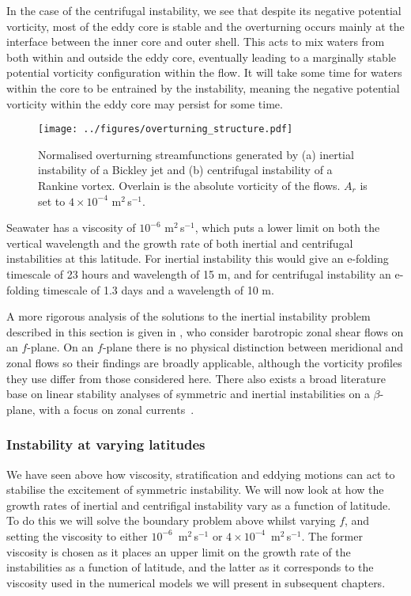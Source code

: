 In the case of the centrifugal instability, we see that despite its negative potential vorticity, most of the eddy core is stable and the overturning occurs mainly at the interface between the inner core and outer shell. This acts to mix waters from both within and outside the eddy core, eventually leading to a marginally stable potential vorticity configuration within the flow. It will take some time for waters within the core to be entrained by the instability, meaning the negative potential vorticity within the eddy core may persist for some time.

\begin{figure}
    \centering
    \texttt{[image: ../figures/overturning\_structure.pdf]}
    \caption{Normalised overturning streamfunctions generated by (a) inertial instability of a Bickley jet and (b) centrifugal instability of a Rankine vortex. Overlain is the absolute vorticity of the flows. $A_r$ is set to $4 \times 10^{-4}$ m$^2\,$s$^{-1}$.}
    \label{fig:2DStructure}
\end{figure}

Seawater has a viscosity of $10^{-6}$ m$^{2}$\,s$^{-1}$, which puts a lower limit on both the vertical wavelength and the growth rate of both inertial and centrifugal instabilities at this latitude. For inertial instability this would give an e-folding timescale of 23 hours and wavelength of 15 m, and for centrifugal instability an e-folding timescale of 1.3 days and a wavelength of 10 m. 

A more rigorous analysis of the solutions to the inertial instability problem described in this section is given in \citet{Plougonven2009}, who consider barotropic zonal shear flows on an $f$-plane. On an $f$-plane there is no physical distinction between meridional and zonal flows so their findings are broadly applicable, although the vorticity profiles they use differ from those considered here. There also exists a broad literature base on linear stability analyses of symmetric and inertial instabilities on a $\beta$-plane, with a focus on zonal currents~\citep[e.g.][]{Kloosterziel2017, Ribstein2014,Griffiths2003, Hua1997}.

\subsubsection{Instability at varying latitudes}
We have seen above how viscosity, stratification and eddying motions can act to stabilise the excitement of symmetric instability. We will now look at how the growth rates of inertial and centrifigal instability vary as a function of latitude. To do this we will solve the boundary problem above whilst varying $f$, and setting the viscosity to either $10^{-6}$~m$^{2}\,$s$^{-1}$ or $4 \times 10^{-4}$~m$^{2}\,$s$^{-1}$. The former viscosity is chosen as it places an upper limit on the growth rate of the instabilities as a function of latitude, and the latter as it corresponds to the viscosity used in the numerical models we will present in subsequent chapters.

